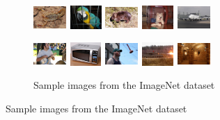 \begin{figure}
\begin{subfigure}{\linewidth}
  \centering
    \includegraphics[width=47px, height=34px]{imagenet/n01770393_7559.JPEG}
    \includegraphics[width=47px, height=34px]{imagenet/n01818515_526.JPEG}
    \includegraphics[width=47px, height=34px]{imagenet/n01883070_1325.JPEG}
    \includegraphics[width=47px, height=34px]{imagenet/n02111889_10614.JPEG}
    \includegraphics[width=47px, height=34px]{imagenet/n02690373_3383.JPEG}
\par\smallskip
    \includegraphics[width=47px, height=34px]{imagenet/n02787622_5752.JPEG}
    \includegraphics[width=47px, height=34px]{imagenet/n03761084_6266.JPEG}
    \includegraphics[width=47px, height=34px]{imagenet/n03970156_5303.JPEG}
    \includegraphics[width=47px, height=34px]{imagenet/n04389033_26607.JPEG}
    \includegraphics[width=47px, height=34px]{imagenet/n04523525_30974.JPEG}
    \caption{Sample images from the ImageNet dataset}
\end{subfigure}

\end{figure}
